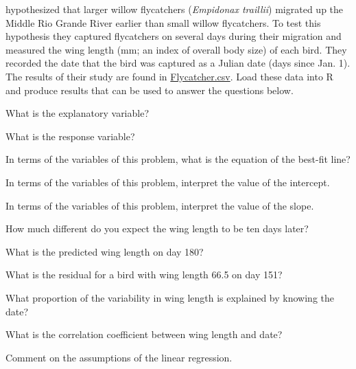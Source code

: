 \documentclass[10pt,openany]{book}\usepackage[]{graphicx}\usepackage[]{color}
\begin{document}
\vspace{-12pt}
\begin{exsection}
  \item \label{revex:RegFlyC} \rhw{} \cite{WangFinch1997} hypothesized that larger willow flycatchers (\emph{Empidonax traillii}) migrated up the Middle Rio Grande River earlier than small willow flycatchers.  To test this hypothesis they captured flycatchers on several days during their migration and measured the wing length (mm; an index of overall body size) of each bird.  They recorded the date that the bird was captured as a Julian date (days since Jan. 1).   The results of their study are found in \href{https://raw.githubusercontent.com/droglenc/NCData/master/Flycatcher.csv}{Flycatcher.csv}.  Load these data into R and produce results that can be used to answer the questions below.  
    \begin{Enumerate}
      \item What is the explanatory variable?
      \item What is the response variable?
      \item In terms of the variables of this problem, what is the equation of the best-fit line?
      \item In terms of the variables of this problem, interpret the value of the intercept.
      \item In terms of the variables of this problem, interpret the value of the slope.
      \item How much different do you expect the wing length to be ten days later?
      \item What is the predicted wing length on day 180?
      \item What is the residual for a bird with wing length 66.5 on day 151?
      \item What proportion of the variability in wing length is explained by knowing the date?
      \item What is the correlation coefficient between wing length and date?
      \item Comment on the assumptions of the linear regression.
    \end{Enumerate}


\end{exsection}
\end{document}
